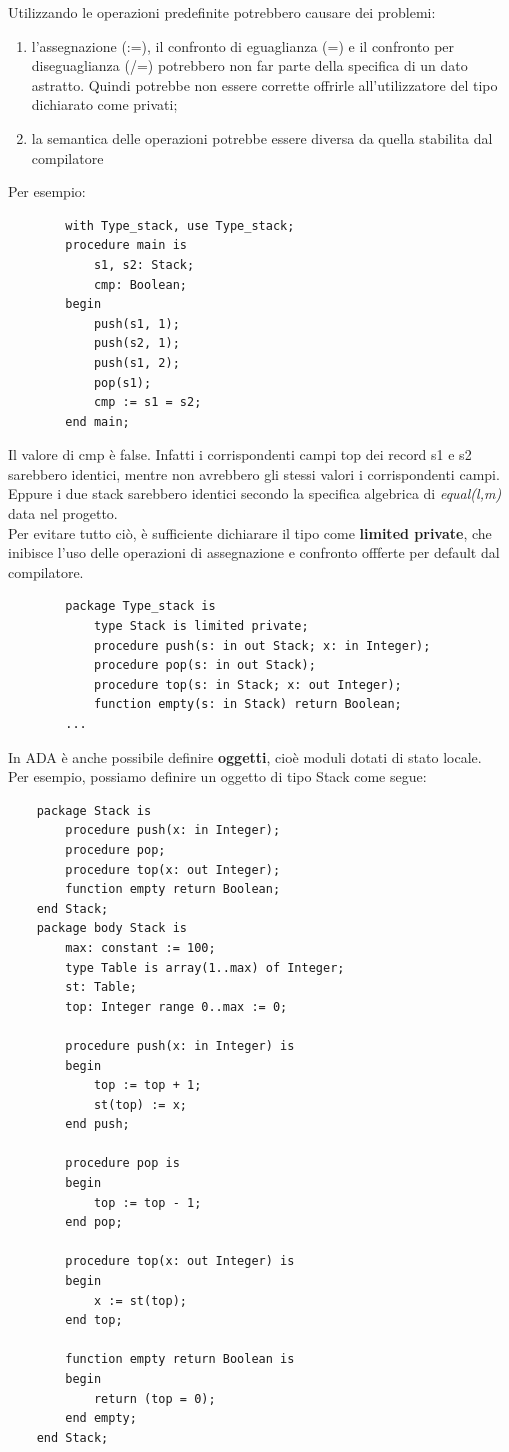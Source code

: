 \documentclass{article}
\begin{document}
	Utilizzando le operazioni predefinite potrebbero causare dei problemi:
	\begin{enumerate}
		\item l'assegnazione (:=), il confronto di eguaglianza (=) e il confronto per diseguaglianza (/=) potrebbero non far parte della specifica di un dato astratto. Quindi potrebbe non essere corrette offrirle all'utilizzatore del tipo dichiarato come privati;
		\item la semantica delle operazioni potrebbe essere diversa da quella stabilita dal compilatore
	\end{enumerate}
	Per esempio:
	\begin{verbatim}
		with Type_stack, use Type_stack;
		procedure main is
		    s1, s2: Stack;
			cmp: Boolean;
		begin
		    push(s1, 1);
		    push(s2, 1);
			push(s1, 2);
			pop(s1);
			cmp := s1 = s2;
		end main;
	\end{verbatim}
	Il valore di cmp è false. Infatti i corrispondenti campi top dei record s1 e s2 sarebbero identici, mentre non avrebbero gli stessi valori i corrispondenti campi. Eppure i due stack sarebbero identici secondo la specifica algebrica di \textit{equal(l,m)} data nel progetto.
	\vspace{\baselineskip} \\
	Per evitare tutto ciò, è sufficiente dichiarare il tipo come \textbf{limited private}, che inibisce l'uso delle operazioni di assegnazione e confronto offferte per default dal compilatore.
	\begin{verbatim}
		package Type_stack is
		    type Stack is limited private;
		    procedure push(s: in out Stack; x: in Integer);
			procedure pop(s: in out Stack);
			procedure top(s: in Stack; x: out Integer);
			function empty(s: in Stack) return Boolean;
		...		
	\end{verbatim}
	In ADA è anche possibile definire \textbf{oggetti}, cioè moduli dotati di stato locale.\\
	Per esempio, possiamo definire un oggetto di tipo Stack come segue:
	\begin{verbatim}
	package Stack is
	    procedure push(x: in Integer);
	    procedure pop;
	    procedure top(x: out Integer);
	    function empty return Boolean;
	end Stack;
	package body Stack is
		max: constant := 100;
		type Table is array(1..max) of Integer;
		st: Table;
		top: Integer range 0..max := 0;

		procedure push(x: in Integer) is
		begin
		    top := top + 1;
		    st(top) := x;
		end push;

		procedure pop is
		begin
		    top := top - 1;
		end pop;

		procedure top(x: out Integer) is
		begin
		    x := st(top);
		end top;

		function empty return Boolean is
		begin
		    return (top = 0);
		end empty;
	end Stack;
	\end{verbatim}
\end{document}
